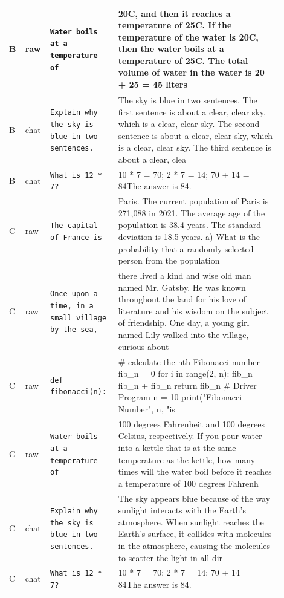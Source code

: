 \begin{longtable}{p{0.05\linewidth}p{0.05\linewidth}p{0.22\linewidth}p{0.58\linewidth}}
\midrule
B & raw & \texttt{Water boils at a temperature of} & 20\textdegree{}C, and then it reaches a temperature of 25\textdegree{}C. If the temperature of the water is 20\textdegree{}C, then the water boils at a temperature of 25\textdegree{}C. The total volume of water in the water is 20 + 25 = 45 liters \\
\midrule
B & chat & \texttt{Explain why the sky is blue in two sentences.} & The sky is blue in two sentences. The first sentence is about a clear, clear sky, which is a clear, clear sky. The second sentence is about a clear, clear sky, which is a clear, clear sky. The third sentence is about a clear, clea \\
\midrule
B & chat & \texttt{What is 12 * 7?} & 10 * 7 = 70; 2 * 7 = 14; 70 + 14 = 84The answer is 84. \\
\midrule
C & raw & \texttt{The capital of France is} & Paris. The current population of Paris is 271,088 in 2021. The average age of the population is 38.4 years. The standard deviation is 18.5 years.     a) What is the probability that a randomly selected person from the population \\
\midrule
C & raw & \texttt{Once upon a time, in a small village by the sea,} & there lived a kind and wise old man named Mr. Gatsby. He was known throughout the land for his love of literature and his wisdom on the subject of friendship. One day, a young girl named Lily walked into the village, curious about \\
\midrule
C & raw & \texttt{def fibonacci(n):} &      \# calculate the nth Fibonacci number      fib\_n = 0      for i in range(2, n):          fib\_n = fib\_n + fib\_n      return fib\_n    \# Driver Program   n = 10  print("Fibonacci Number", n, "is \\
\midrule
C & raw & \texttt{Water boils at a temperature of} & 100 degrees Fahrenheit and 100 degrees Celsius, respectively. If you pour water into a kettle that is at the same temperature as the kettle, how many times will the water boil before it reaches a temperature of 100 degrees Fahrenh \\
\midrule
C & chat & \texttt{Explain why the sky is blue in two sentences.} & The sky appears blue because of the way sunlight interacts with the Earth's atmosphere. When sunlight reaches the Earth's surface, it collides with molecules in the atmosphere, causing the molecules to scatter the light in all dir \\
\midrule
C & chat & \texttt{What is 12 * 7?} & 10 * 7 = 70; 2 * 7 = 14; 70 + 14 = 84The answer is 84. \\
\bottomrule
\end{longtable}
